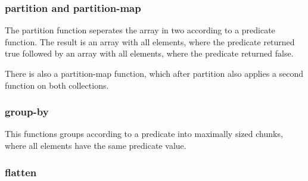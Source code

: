 \subsubsection{partition and
partition-map}\label{partition-and-partition-map}

The partition function seperates the array in two according to a
predicate function. The result is an array with all elements, where the
predicate returned true followed by an array with all elements, where
the predicate returned false.

\begin{Shaded}
\begin{Highlighting}[]
\end{Highlighting}
\end{Shaded}

There is also a partition-map function, which after partition also
applies a second function on both collections.

\begin{Shaded}
\begin{Highlighting}[]
\end{Highlighting}
\end{Shaded}

\subsubsection{group-by}\label{group-by}

This functions groups according to a predicate into maximally sized
chunks, where all elements have the same predicate value.

\begin{Shaded}
\begin{Highlighting}[]
\end{Highlighting}
\end{Shaded}

\subsubsection{flatten}\label{flatten}


